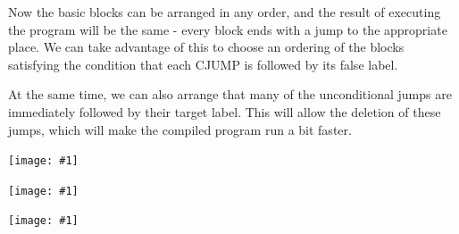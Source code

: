 \documentclass[8pt, a4paper, oneside, twocolumn]{extarticle}
\newcommand{\ph}[1]{
    \texttt{[image: \#1]}
}
\begin{document}
Now the basic blocks can be arranged in any order, and the result of executing
the program will be the same - every block ends with a jump to the 
appropriate place. We can take advantage of this to choose an ordering of the blocks
satisfying the condition that each CJUMP is followed by its false label.

At the same time, we can also arrange that many of the unconditional
jumps are immediately followed by their target label. This will allow the
deletion of these jumps, which will make the compiled program run a bit
faster.

\ph{818}

\ph{819}

\ph{820}
\end{document}
